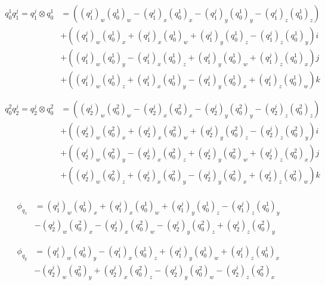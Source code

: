 \documentclass{article}
\begin{document}
\begin{align}
    \begin{split}
        q_0^1q_1^j = q_1^j\otimes q_0^1 &= ((q_1^j)_w(q_0^1)_w - (q_1^j)_x(q_0^1)_x - (q_1^j)_y(q_0^1)_y - (q_1^j)_z(q_0^1)_z) \\
                                        &+ ((q_1^j)_w(q_0^1)_x + (q_1^j)_x(q_0^1)_w + (q_1^j)_y(q_0^1)_z - (q_1^j)_z(q_0^1)_y)i \\
                                        &+ ((q_1^j)_w(q_0^1)_y - (q_1^j)_x(q_0^1)_z + (q_1^j)_y(q_0^1)_w + (q_1^j)_z(q_0^1)_x)j \\
                                        &+ ((q_1^j)_w(q_0^1)_z + (q_1^j)_x(q_0^1)_y - (q_1^j)_y(q_0^1)_x + (q_1^j)_z(q_0^1)_w)k
    \end{split}\\
    \nonumber\\
    \begin{split}
        q_0^2q_2^j = q_2^j\otimes q_0^2 &= ((q_2^j)_w(q_0^2)_w - (q_2^j)_x(q_0^2)_x - (q_2^j)_y(q_0^2)_y - (q_2^j)_z(q_0^2)_z) \\
                                        &+ ((q_2^j)_w(q_0^2)_x + (q_2^j)_x(q_0^2)_w + (q_2^j)_y(q_0^2)_z - (q_2^j)_z(q_0^2)_y)i \\
                                        &+ ((q_2^j)_w(q_0^2)_y - (q_2^j)_x(q_0^2)_z + (q_2^j)_y(q_0^2)_w + (q_2^j)_z(q_0^2)_x)j \\
                                        &+ ((q_2^j)_w(q_0^2)_z + (q_2^j)_x(q_0^2)_y - (q_2^j)_y(q_0^2)_x + (q_2^j)_z(q_0^2)_w)k
    \end{split}
\end{align}

\begin{align}
    \begin{split}
        \phi_{q_x} &= (q_1^j)_w(q_0^1)_x + (q_1^j)_x(q_0^1)_w + (q_1^j)_y(q_0^1)_z - (q_1^j)_z(q_0^1)_y \\
                   &- (q_2^j)_w(q_0^2)_x - (q_2^j)_x(q_0^2)_w - (q_2^j)_y(q_0^2)_z + (q_2^j)_z(q_0^2)_y
    \end{split}\\
    \nonumber\\
    \begin{split}
        \phi_{q_y} &= (q_1^j)_w(q_0^1)_y - (q_1^j)_x(q_0^1)_z + (q_1^j)_y(q_0^1)_w + (q_1^j)_z(q_0^1)_x \\
                   &- (q_2^j)_w(q_0^2)_y + (q_2^j)_x(q_0^2)_z - (q_2^j)_y(q_0^2)_w - (q_2^j)_z(q_0^2)_x
    \end{split}
\end{align}
\end{document}

